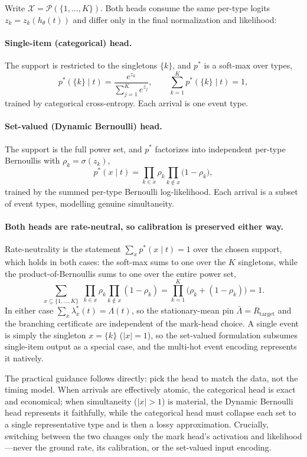 Write $\mathcal{X}=\mathcal{P}(\{1,\ldots,K\})$. Both heads consume the same per-type
logits $z_k=z_k(h_\theta(t))$ and differ only in the final normalization and likelihood:

\paragraph{Single-item (categorical) head.} The support is restricted to the singletons
$\{k\}$, and $p^*$ is a soft-max over types,
\[
p^*(\{k\}\mid t)=\frac{e^{z_k}}{\sum_{j=1}^{K}e^{z_j}},
\qquad
\sum_{k=1}^{K}p^*(\{k\}\mid t)=1,
\]
trained by categorical cross-entropy. Each arrival is one event type.

\paragraph{Set-valued (Dynamic Bernoulli) head.} The support is the full power set, and
$p^*$ factorizes into independent per-type Bernoullis with $\rho_k=\sigma(z_k)$,
\[
p^*(x\mid t)=\prod_{k\in x}\rho_k\prod_{k\notin x}\bigl(1-\rho_k\bigr),
\]
trained by the summed per-type Bernoulli log-likelihood. Each arrival is a subset of
event types, modelling genuine simultaneity.

\paragraph{Both heads are rate-neutral, so calibration is preserved either way.}
Rate-neutrality is the statement $\sum_{x}p^*(x\mid t)=1$ over the chosen support, which
holds in both cases: the soft-max sums to one over the $K$ singletons, while the
product-of-Bernoullis sums to one over the entire power set,
\[
\sum_{x\subseteq\{1,\ldots,K\}}\;\prod_{k\in x}\rho_k\prod_{k\notin x}(1-\rho_k)
=\prod_{k=1}^{K}\bigl(\rho_k+(1-\rho_k)\bigr)=1.
\]
In either case $\sum_{x}\lambda_x^*(t)=\Lambda(t)$, so the stationary-mean pin
$\bar{\Lambda}=R_{\mathrm{target}}$ and the branching certificate are independent of the
mark-head choice. A single event is simply the singleton $x=\{k\}$ ($|x|=1$), so the
set-valued formulation subsumes single-item output as a special case, and the multi-hot
event encoding represents it natively.

The practical guidance follows directly: pick the head to match the data, not the timing
model. When arrivals are effectively atomic, the categorical head is exact and economical;
when simultaneity ($|x|>1$) is material, the Dynamic Bernoulli head represents it
faithfully, while the categorical head must collapse each set to a single representative
type and is then a lossy approximation. Crucially, switching between the two changes only
the mark head's activation and likelihood---never the ground rate, its calibration, or the
set-valued input encoding.

